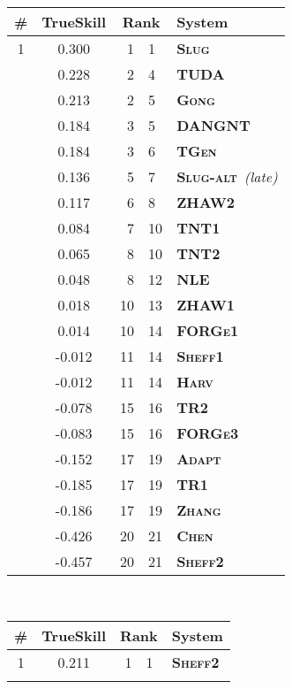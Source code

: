 \documentclass[11pt,a4paper]{article}
\newcommand\tgen{\textsc{TGen}\xspace}
\newcommand\slug{\textsc{Slug}\xspace}
\newcommand\slugalt{\textsc{Slug-alt}\xspace}
\newcommand\tntnlgi{\textsc{TNT1}\xspace}
\newcommand\tntnlgii{\textsc{TNT2}\xspace}
\newcommand\zhawi{\textsc{ZHAW1}\xspace}
\newcommand\zhawii{\textsc{ZHAW2}\xspace}
\newcommand\adapt{\textsc{Adapt}\xspace}
\newcommand\dangnt{\textsc{DANGNT}\xspace}
\newcommand\forgei{\textsc{FORGe1}\xspace}
\newcommand\forgeiii{\textsc{FORGe3}\xspace}
\newcommand\gong{\textsc{Gong}\xspace}
\newcommand\harv{\textsc{Harv}\xspace}
\newcommand\nle{\textsc{NLE}\xspace}
\newcommand\sheffi{\textsc{Sheff1}\xspace}
\newcommand\sheffii{\textsc{Sheff2}\xspace}
\newcommand\chen{\textsc{Chen}\xspace}
\newcommand\thomsoni{\textsc{TR1}\xspace}
\newcommand\thomsonii{\textsc{TR2}\xspace}
\newcommand\tuda{\textsc{TUDA}\xspace}
\newcommand\zhang{\textsc{Zhang}\xspace}
\newcommand{\symbseq}{}
\newcommand{\symbdd}{}
\newcommand{\symbrule}{}
\newcommand{\symbtempl}{}
\newcommand\Ctgen{\textcolor{seqtoseq}{\symbseq\bf \tgen}}
\newcommand\Cslug{\textcolor{seqtoseq}{\symbseq\bf \slug}}
\newcommand\Cslugalt{\textcolor{seqtoseq}{\symbseq\bf \slugalt}}
\newcommand\Ctntnlgi{\textcolor{seqtoseq}{\symbseq\bf \tntnlgi}}
\newcommand\Ctntnlgii{\textcolor{seqtoseq}{\symbseq\bf \tntnlgii}}
\newcommand\Czhawi{\textcolor{datadriven}{\symbdd\bf \zhawi}}
\newcommand\Czhawii{\textcolor{datadriven}{\symbdd\bf \zhawii}}
\newcommand\Cadapt{\textcolor{seqtoseq}{\symbseq\bf \adapt}}
\newcommand\Cdangnt{\textcolor{rules}{\symbrule\bf \dangnt}}
\newcommand\Cforgei{\textcolor{rules}{\symbrule\bf \forgei}}
\newcommand\Cforgeiii{\textcolor{templates}{\symbtempl\bf \forgeiii}}
\newcommand\Cgong{\textcolor{seqtoseq}{\symbseq\bf \gong}}
\newcommand\Charv{\textcolor{seqtoseq}{\symbseq\bf \harv}}
\newcommand\Cnle{\textcolor{seqtoseq}{\symbseq\bf \nle}}
\newcommand\Csheffi{\textcolor{datadriven}{\symbdd\bf \sheffi}}
\newcommand\Csheffii{\textcolor{seqtoseq}{\symbseq\bf \sheffii}}
\newcommand\Cchen{\textcolor{seqtoseq}{\symbseq\bf \chen}}
\newcommand\Cthomsoni{\textcolor{seqtoseq}{\symbseq\bf \thomsoni}}
\newcommand\Cthomsonii{\textcolor{templates}{\symbtempl\bf \thomsonii}}
\newcommand\Ctuda{\textcolor{templates}{\symbtempl\bf \tuda}}
\newcommand\Czhang{\textcolor{seqtoseq}{\symbseq\bf \zhang}}
\begin{document}
\begin{table*}[tp]
\begin{center}
\scriptsize
\setlength{\extrarowheight}{2pt}
\
\begin{tabular}{ccr@{--}ll}
\bf \#  & \bf TrueSkill  & \multicolumn{2}{c}{\bf Rank}  & \bf System \\\hline\hline
1  & \phantom{-}0.300  & 1 & 1  & \Cslug \\\hdashline[0.5pt/2pt]
\multirow{13}{*}{2}  & \phantom{-}0.228  & 2 & 4  & \Ctuda \\
& \phantom{-}0.213  & 2 & 5  & \Cgong \\
& \phantom{-}0.184  & 3 & 5  & \Cdangnt \\
& \phantom{-}0.184  & 3 & 6  & \Ctgen \\
& \phantom{-}0.136  & 5 & 7  & \Cslugalt~\emph{(late)} \\
& \phantom{-}0.117  & 6 & 8  & \Czhawii \\
& \phantom{-}0.084  & 7 & 10  & \Ctntnlgi \\
& \phantom{-}0.065  & 8 & 10  & \Ctntnlgii \\
& \phantom{-}0.048  & 8 & 12  & \Cnle \\
& \phantom{-}0.018  & 10 & 13  & \Czhawi \\
& \phantom{-}0.014  & 10 & 14  & \Cforgei \\
& -0.012  & 11 & 14  & \Csheffi \\
& -0.012  & 11 & 14  & \Charv \\\hdashline[0.5pt/2pt]
\multirow{2}{*}{3}  & -0.078  & 15 & 16  & \Cthomsonii \\
& -0.083  & 15 & 16  & \Cforgeiii \\\hdashline[0.5pt/2pt]
\multirow{3}{*}{4}  & -0.152  & 17 & 19  & \Cadapt \\
& -0.185  & 17 & 19  & \Cthomsoni \\
& -0.186  & 17 & 19  & \Czhang \\\hdashline[0.5pt/2pt]
\multirow{2}{*}{5}  & -0.426  & 20 & 21  & \Cchen \\
& -0.457  & 20 & 21  & \Csheffii \\
\end{tabular}
\qquad\qquad
{}
\  
\begin{tabular}{ccr@{--}ll}
\bf \#  & \bf TrueSkill  & \multicolumn{2}{c}{\bf Rank}  & \bf System \\\hline\hline
1  & \phantom{-}0.211  & 1 & 1  & \Csheffii \\\hdashline[0.5pt/2pt]

\end{tabular}
\end{center}
\end{table*}
\end{document}

